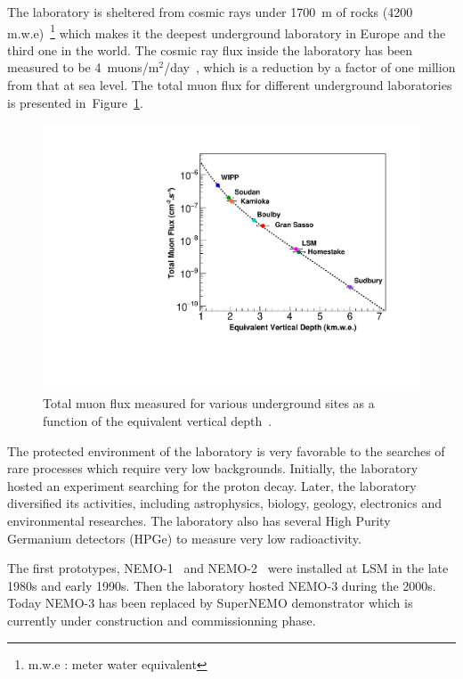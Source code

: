\documentclass[main.tex]{subfiles}
\begin{document}
\NI The laboratory is sheltered from cosmic rays under 1700~m of rocks (4200 m.w.e)~\footnote{m.w.e : meter water equivalent} which makes it the deepest underground laboratory in Europe and the third one in the world. The cosmic ray flux inside the laboratory has been measured to be 4~muons/m$^\text{2}$/day~\cite{CosmicFluxLSM}, which is a reduction by a factor of one million from that at sea level. The total muon flux for different underground laboratories is presented in~Figure~\ref{LabDeepth}.
 

\begin{figure}[h!]
\begin{center}
\includegraphics[scale=0.60]{pictures/Chap3/MuonFluxDifferentLab.pdf}
\caption{Total muon flux measured for various underground sites as a function of the equivalent vertical depth~\cite{MuonFluxUndergroundLab}. }
\label{LabDeepth}
\end{center}
\end{figure}


\NI The protected environment of the laboratory is very favorable to the searches of rare processes which require very low backgrounds. Initially, the laboratory hosted an experiment searching for the proton decay. Later, the laboratory diversified its activities, including astrophysics, biology, geology, electronics and environmental researches. The laboratory also has several High Purity Germanium detectors (HPGe) to measure very low radioactivity. 


\bigskip


\NI The first prototypes, NEMO-1~\cite{NEMO1} and NEMO-2~\cite{NEMO2} were installed at LSM in the late 1980s and early 1990s. Then the laboratory hosted NEMO-3 during the 2000s. Today NEMO-3 has been replaced by SuperNEMO demonstrator which is currently under construction and commissionning phase.
\end{document}
